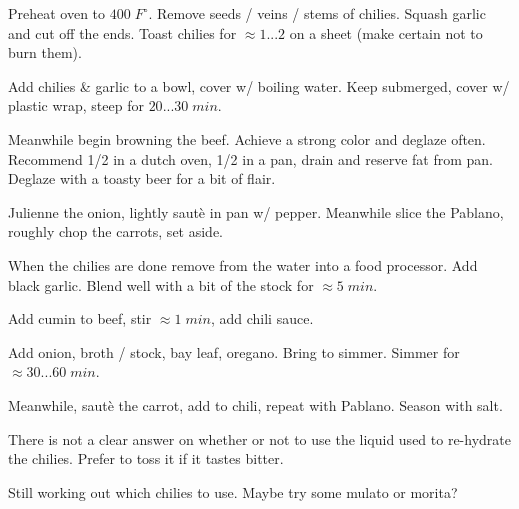 \begin{preparation}
\item Preheat oven to $400\;F^\circ$. Remove seeds / veins / stems of chilies. Squash garlic and cut off the ends. Toast chilies for $\approx 1...2$ on a sheet (make certain not to burn them).
\item Add chilies \& garlic to a bowl, cover w/ boiling water. Keep submerged, cover w/ plastic wrap, steep for $20...30\;min$.
\item Meanwhile begin browning the beef. Achieve a strong color and deglaze often. Recommend 1/2 in a dutch oven, 1/2 in a pan, drain and reserve fat from pan. Deglaze with a toasty beer for a bit of flair.
\item Julienne the onion, lightly saut\`{e} in pan w/ pepper. Meanwhile slice the Pablano, roughly chop the carrots, set aside.
\item When the chilies are done remove from the water into a food processor. Add black garlic. Blend well with a bit of the stock for $\approx5\;min$.
\item Add cumin to beef, stir $\approx 1\;min$, add chili sauce.
\item Add onion, broth / stock, bay leaf, oregano. Bring to simmer. Simmer for $\approx30...60\;min$.
\item Meanwhile, saut\`{e} the carrot, add to chili, repeat with Pablano. Season with salt.
\end{preparation}

\begin{variation}
	\item There is not a clear answer on whether or not to use the liquid used to re-hydrate the chilies. Prefer to toss it if it tastes bitter.
\end{variation}

\begin{experiments}
	\item Still working out which chilies to use. Maybe try some mulato or morita?
\end{experiments}

\recipeend
